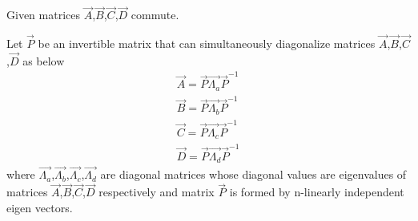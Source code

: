 Given matrices $\vec{A}$,$\vec{B}$,$\vec{C}$,$\vec{D}$ commute.

Let $\vec{P}$ be an invertible matrix that can simultaneously diagonalize matrices $\vec{A}$,$\vec{B}$,$\vec{C}$,$\vec{D}$ as below
\begin{align}
    \vec{A}=\vec{P}\vec{\Lambda_a}\vec{P}^{-1}\label{eq:solutions/6/5/4/A}\\
    \vec{B}=\vec{P}\vec{\Lambda_b}\vec{P}^{-1}\label{eq:solutions/6/5/4/B}\\
    \vec{C}=\vec{P}\vec{\Lambda_c}\vec{P}^{-1}\label{eq:solutions/6/5/4/C}\\
    \vec{D}=\vec{P}\vec{\Lambda_d}\vec{P}^{-1}\label{eq:solutions/6/5/4/D}
\end{align}
where $\vec{\Lambda_a}$,$\vec{\Lambda_b}$,$\vec{\Lambda_c}$,$\vec{\Lambda_d}$ are diagonal matrices whose diagonal values are eigenvalues of matrices $\vec{A}$,$\vec{B}$,$\vec{C}$,$\vec{D}$ respectively and matrix $\vec{P}$ is formed by n-linearly independent eigen vectors.

